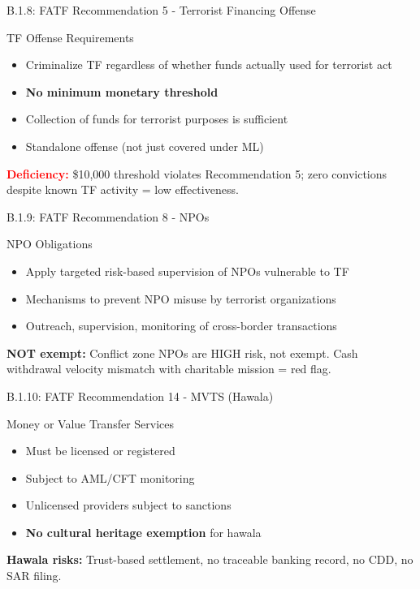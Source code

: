 \documentclass{beamer}
\begin{document}
	\begin{frame}{B.1.8: FATF Recommendation 5 - Terrorist Financing Offense}
		\begin{block}{TF Offense Requirements}
			\begin{itemize}
				\item Criminalize TF regardless of whether funds actually used for terrorist act
				\item \textbf{No minimum monetary threshold}
				\item Collection of funds for terrorist purposes is sufficient
				\item Standalone offense (not just covered under ML)
			\end{itemize}
		\end{block}
		\textcolor{red}{\textbf{ Deficiency:}} \$10,000 threshold violates Recommendation 5; zero convictions despite known TF activity = low effectiveness.
	\end{frame}
	
	\begin{frame}{B.1.9: FATF Recommendation 8 - NPOs}
		\begin{block}{NPO Obligations}
			\begin{itemize}
				\item Apply targeted risk-based supervision of NPOs vulnerable to TF
				\item Mechanisms to prevent NPO misuse by terrorist organizations
				\item Outreach, supervision, monitoring of cross-border transactions
			\end{itemize}
		\end{block}
		\textbf{NOT exempt:} Conflict zone NPOs are HIGH risk, not exempt. Cash withdrawal velocity mismatch with charitable mission = red flag.
	\end{frame}
	
	\begin{frame}{B.1.10: FATF Recommendation 14 - MVTS (Hawala)}
		\begin{block}{Money or Value Transfer Services}
			\begin{itemize}
				\item Must be licensed or registered
				\item Subject to AML/CFT monitoring
				\item Unlicensed providers subject to sanctions
				\item \textbf{No cultural heritage exemption} for hawala
			\end{itemize}
		\end{block}
		\textbf{Hawala risks:} Trust-based settlement, no traceable banking record, no CDD, no SAR filing.
	\end{frame}
	
\end{document}
